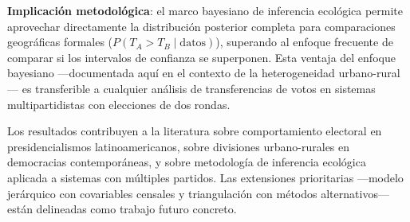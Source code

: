 \textbf{Implicación metodológica}: el marco bayesiano de inferencia ecológica permite aprovechar directamente la distribución posterior completa para comparaciones geográficas formales ($P(T_A > T_B \mid \text{datos})$), superando al enfoque frecuente de comparar si los intervalos de confianza se superponen. Esta ventaja del enfoque bayesiano ---documentada aquí en el contexto de la heterogeneidad urbano-rural--- es transferible a cualquier análisis de transferencias de votos en sistemas multipartidistas con elecciones de dos rondas.

Los resultados contribuyen a la literatura sobre comportamiento electoral en presidencialismos latinoamericanos, sobre divisiones urbano-rurales en democracias contemporáneas, y sobre metodología de inferencia ecológica aplicada a sistemas con múltiples partidos. Las extensiones prioritarias ---modelo jerárquico con covariables censales y triangulación con métodos alternativos--- están delineadas como trabajo futuro concreto.
